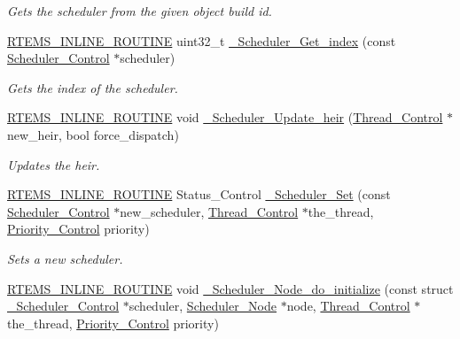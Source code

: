 \begin{DoxyCompactItemize}
\begin{DoxyCompactList}\small\item\em Gets the scheduler from the given object build id. \end{DoxyCompactList}\item 
\mbox{\hyperlink{group__RTEMSScoreBaseDefs_gac216239df231d5dbd15e3520b0b9313f}{R\+T\+E\+M\+S\+\_\+\+I\+N\+L\+I\+N\+E\+\_\+\+R\+O\+U\+T\+I\+NE}} uint32\+\_\+t \mbox{\hyperlink{group__RTEMSScoreScheduler_ga22b124b409502e8e91d3faeab16367ac}{\+\_\+\+Scheduler\+\_\+\+Get\+\_\+index}} (const \mbox{\hyperlink{struct__Scheduler__Control}{Scheduler\+\_\+\+Control}} $\ast$scheduler)
\begin{DoxyCompactList}\small\item\em Gets the index of the scheduler. \end{DoxyCompactList}\item 
\mbox{\hyperlink{group__RTEMSScoreBaseDefs_gac216239df231d5dbd15e3520b0b9313f}{R\+T\+E\+M\+S\+\_\+\+I\+N\+L\+I\+N\+E\+\_\+\+R\+O\+U\+T\+I\+NE}} void \mbox{\hyperlink{group__RTEMSScoreScheduler_ga29bb7f28ab22ddb95869cc527f2f75bf}{\+\_\+\+Scheduler\+\_\+\+Update\+\_\+heir}} (\mbox{\hyperlink{struct__Thread__Control}{Thread\+\_\+\+Control}} $\ast$new\+\_\+heir, bool force\+\_\+dispatch)
\begin{DoxyCompactList}\small\item\em Updates the heir. \end{DoxyCompactList}\item 
\mbox{\hyperlink{group__RTEMSScoreBaseDefs_gac216239df231d5dbd15e3520b0b9313f}{R\+T\+E\+M\+S\+\_\+\+I\+N\+L\+I\+N\+E\+\_\+\+R\+O\+U\+T\+I\+NE}} Status\+\_\+\+Control \mbox{\hyperlink{group__RTEMSScoreScheduler_gafdf8dfa2c90ca2122b995bb6dd42fcda}{\+\_\+\+Scheduler\+\_\+\+Set}} (const \mbox{\hyperlink{struct__Scheduler__Control}{Scheduler\+\_\+\+Control}} $\ast$new\+\_\+scheduler, \mbox{\hyperlink{struct__Thread__Control}{Thread\+\_\+\+Control}} $\ast$the\+\_\+thread, \mbox{\hyperlink{group__RTEMSScorePriority_ga59d02b58072d31a9a1cfe644557aefe2}{Priority\+\_\+\+Control}} priority)
\begin{DoxyCompactList}\small\item\em Sets a new scheduler. \end{DoxyCompactList}\item 
\mbox{\hyperlink{group__RTEMSScoreBaseDefs_gac216239df231d5dbd15e3520b0b9313f}{R\+T\+E\+M\+S\+\_\+\+I\+N\+L\+I\+N\+E\+\_\+\+R\+O\+U\+T\+I\+NE}} void \mbox{\hyperlink{group__RTEMSScoreScheduler_ga04a65b42652ef556df7f53940d4c1a11}{\+\_\+\+Scheduler\+\_\+\+Node\+\_\+do\+\_\+initialize}} (const struct \mbox{\hyperlink{struct__Scheduler__Control}{\+\_\+\+Scheduler\+\_\+\+Control}} $\ast$scheduler, \mbox{\hyperlink{structScheduler__Node}{Scheduler\+\_\+\+Node}} $\ast$node, \mbox{\hyperlink{struct__Thread__Control}{Thread\+\_\+\+Control}} $\ast$the\+\_\+thread, \mbox{\hyperlink{group__RTEMSScorePriority_ga59d02b58072d31a9a1cfe644557aefe2}{Priority\+\_\+\+Control}} priority)

\end{DoxyCompactItemize}
